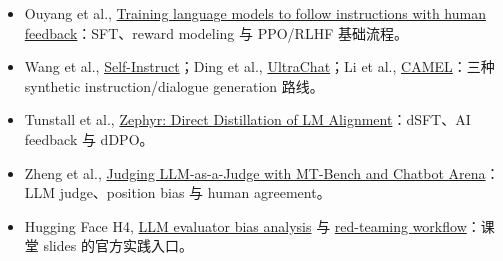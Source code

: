 \documentclass[a4paper]{article}
\begin{document}
\begingroup
\scriptsize
\begin{itemize}[itemsep=0pt,topsep=0.15em,parsep=0pt]
  \item Ouyang et al., \href{https://arxiv.org/abs/2203.02155}{Training language models to follow instructions with human feedback}：SFT、reward modeling 与 PPO/RLHF 基础流程。
  \item Wang et al., \href{https://arxiv.org/abs/2212.10560}{Self-Instruct}；Ding et al., \href{https://arxiv.org/abs/2305.14233}{UltraChat}；Li et al., \href{https://arxiv.org/abs/2303.17760}{CAMEL}：三种 synthetic instruction/dialogue generation 路线。
  \item Tunstall et al., \href{https://arxiv.org/abs/2310.16944}{Zephyr: Direct Distillation of LM Alignment}：dSFT、AI feedback 与 dDPO。
  \item Zheng et al., \href{https://arxiv.org/abs/2306.05685}{Judging LLM-as-a-Judge with MT-Bench and Chatbot Arena}：LLM judge、position bias 与 human agreement。
  \item Hugging Face H4, \href{https://huggingface.co/blog/llm-leaderboard}{LLM evaluator bias analysis} 与 \href{https://huggingface.co/blog/red-teaming}{red-teaming workflow}：课堂 slides 的官方实践入口。
\end{itemize}
\endgroup
\end{document}
